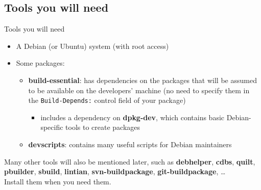 \documentclass[10pt,final]{beamer}
\begin{document}
\subsection{Tools you will need}
\begin{frame}{Tools you will need}
  \begin{itemize}
  \item A Debian (or Ubuntu) system (with root access)
    \br
  \item Some packages:
    \begin{itemize}
    \item \textbf{build-essential}: has dependencies on the packages that will
      be assumed to be available on the developers' machine (no need to specify
      them in the \texttt{Build-Depends:} control field of your package)
      \begin{itemize}
      \item includes a dependency on \textbf{dpkg-dev}, which contains basic
        Debian-specific tools to create packages
      \end{itemize}
      \hbr
    \item \textbf{devscripts}: contains many useful scripts for Debian
      maintainers
    \end{itemize}
  \end{itemize}

  \br
  Many other tools will also be mentioned later, such as \textbf{debhelper},
  \textbf{cdbs}, \textbf{quilt}, \textbf{pbuilder}, \textbf{sbuild},
  \textbf{lintian}, \textbf{svn-buildpackage}, \textbf{git-buildpackage},
  \ldots\\
  Install them when you need them.
\end{frame}
\end{document}
